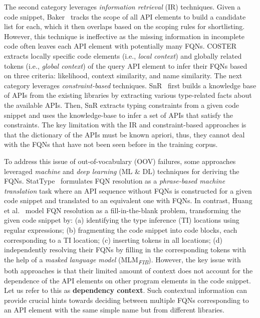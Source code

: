 The second category leverages {\em information retrieval} (IR) techniques. Given a code snippet, Baker~\cite{liveapi14} tracks the scope of all API elements to build a candidate list for each, which it then overlaps based on the scoping rules for shortlisting. However, this technique is ineffective as the missing information in incomplete code often leaves each API element with potentially many FQNs.
COSTER~\cite{coster-ase19} extracts locally specific code elements (i.e., \textit{local context}) and globally related tokens (i.e., \textit{global context}) of the query API element to infer their FQNs based on three criteria: likelihood, context similarity, and name similarity.
The next category leverages {\em constraint-based} techniques. SnR~\cite{snr-icse22} first builds a knowledge base of APIs from the existing libraries by extracting various type-related facts about the available APIs. Then, SnR extracts typing constraints from a given code snippet and uses the knowledge-base to infer a set of APIs that satisfy the constraints.
The key limitation with the IR and constraint-based approaches is that the dictionary of the APIs must be known apriori, thus, they cannot deal with the FQNs  that have not been seen before in the training corpus.

To address this issue of out-of-vocabulary (OOV) failures, some approaches leveraged {\em machine} and {\em deep learning} (ML \& DL) techniques for deriving the FQNs. 
StatType~\cite{icse18} formulates FQN resolution as a {\em phrase-based machine translation} task where an API sequence without FQNs is constructed for a given code snippet and translated to an equivalent one with FQNs.
In contrast, Huang et al.~\cite{prompt-ase22} model FQN resolution as a fill-in-the-blank problem, transforming the given code snippet by: (a) identifying the type inference (TI) locations using regular expressions; (b) fragmenting the code snippet into code blocks, each corresponding to a TI location; (c) inserting \code{[MASK]} tokens in all locations; (d) independently resolving their FQNs by filling in the corresponding \code{[MASK]} tokens with the help of a {\em masked language model} (MLM\textsubscript{\textit{FIB}}).
However, the key issue with both approaches is that their limited amount of context does not account for the dependence of the API elements on other program elements in the code snippet. Let us refer to this as \textbf{dependency context}. Such contextual information can provide crucial hints towards deciding between multiple FQNs corresponding to an API element with the same simple name but from different libraries. 


